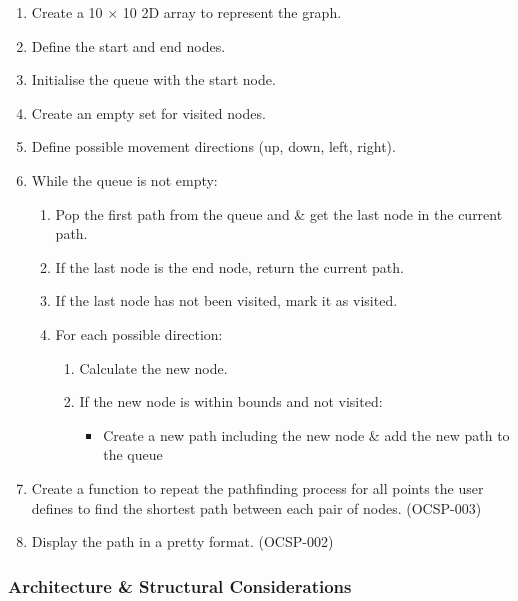 \begin{enumerate}
    \item Create a 10 $\times$ 10 2D array to represent the graph.
    \item Define the start and end nodes.
    \item Initialise the queue with the start node.
    \item Create an empty set for visited nodes.
    \item Define possible movement directions (up, down, left, right).
    \item While the queue is not empty:
        \begin{enumerate}
            \item Pop the first path from the queue and \& get the last node in the current path.
            \item If the last node is the end node, return the current path.
            \item If the last node has not been visited, mark it as visited.
            \item For each possible direction:
                \begin{enumerate}
                    \item Calculate the new node.
                    \item If the new node is within bounds and not visited:
                        \begin{itemize}
                            \item Create a new path including the new node \& add the new path to the queue
                        \end{itemize}
                \end{enumerate}
        \end{enumerate}
    \item Create a function to repeat the pathfinding process for all points the user defines to find the shortest path between each pair of nodes. (OCSP-003)
    \item Display the path in a pretty format. (OCSP-002)
\end{enumerate}

\subsubsection{Architecture \& Structural Considerations}

